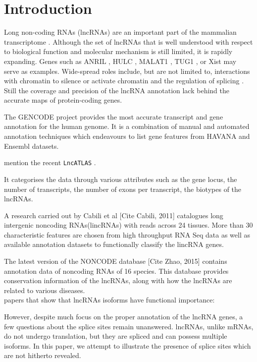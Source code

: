 \documentclass[ncrna,article,submit,moreauthors,pdftex,10pt,a4paper]{mdpi}
\newcommand{\TODO}[1]{\begingroup\color{red}#1\endgroup}
\begin{document}
\section{Introduction}

Long non-coding RNAs (lncRNAs) are an important part of the mammalian
transcriptome \cite{Clark:11a,ENCODE:12}. Although the set of lncRNAs that
is well understood with respect to biological function and molecular
mechanism is still limited, it is rapidly expanding. Genes such as ANRIL
\cite{Li:16A,Aguilo:16}, HULC \cite{Yu:17}, MALAT1 \cite{Liu:17}, TUG1
\cite{Li:16}, or Xist \cite{daRocha:17} may serve as
examples. Wide-spread roles include, but are not limited to, interactions
with chromatin to silence or activate chromatin
\cite{guttmannat2012,Deng:16} and the regulation of splicing
\cite{Luco:16}. Still the coverage and precision of the lncRNA annotation
lack behind the accurate maps of protein-coding genes.

The GENCODE project \cite{harrow2012} provides the most accurate transcript
and gene annotation for the human genome. It is a combination of manual and
automated annotation techniques which endeavours to list gene features from
HAVANA and Ensembl datasets. 

\TODO{mention the recent \texttt{LncATLAS} \cite{MasPonte:17}.}



 It categorises the data through various
attributes such as the gene locus, the number of transcripts, the number of
exons per transcript, the biotypes of the lncRNAs.

A research carried out by Cabili et al \cite{cabili2011}[Cite Cabili, 2011] catalogues long intergenic noncoding RNAs(lincRNAs) with reads across 24 tissues. More than 30 characteristic features 
are chosen from high throughput RNA Seq data as well as available annotation datasets to functionally classify the lincRNA genes.

The latest version of the NONCODE database \cite{zhao2016}[Cite Zhao, 2015] contains annotation data of noncoding RNAs of 16 species. This database provides conservation 
information of the lncRNAs, along with how the lncRNAs are related to various diseases.\\


\TODO{papers that show that lncRNAs isoforms have functional importance:
\cite{Holdt:13a}}



However, despite much focus on the proper annotation of the lncRNA genes, a few questions about the splice sites remain unanswered. lncRNAs, unlike mRNAs,
do not undergo translation, but they are spliced and can possess multiple isoforms. In this paper, we attempt to illustrate the presence of 
splice sites which are not hitherto revealed. 
\end{document}
